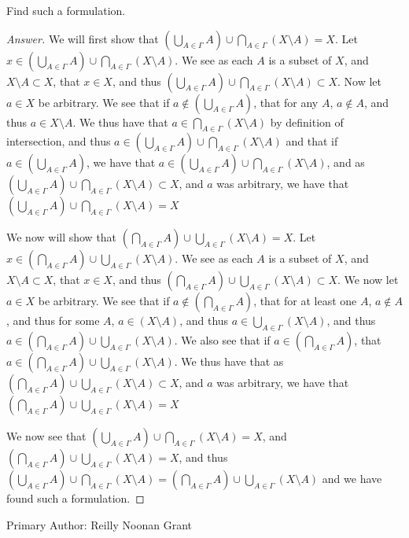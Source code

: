 \begin{minorEx}
    [Riddle]
    Find such a formulation.
\end{minorEx}
\begin{proof}[Answer]
  We will first show that $(\bigcup_{A \in \Gamma} A ) \cup
  \bigcap_{A \in\Gamma}(X \setminus A) = X$.  Let 
  $x \in (\bigcup_{A \in \Gamma} A ) \cup
  \bigcap_{A \in\Gamma}(X \setminus A)$. We see as each $A$ is a
  subset of $X$, and $X\setminus A \subset X$, that $x\in X$, and thus 
  $(\bigcup_{A \in \Gamma} A ) \cup
  \bigcap_{A \in\Gamma}(X \setminus A) \subset X$. Now let $a \in X$
  be arbitrary. We see that if $a \notin (\bigcup_{A \in \Gamma} A )$,
  that for any $A$, $a \notin A$, and thus $a \in X \setminus A$. We
  thus have that $a\in \bigcap_{A \in\Gamma}(X \setminus A)$ by
  definition of intersection, and thus $a\in (\bigcup_{A \in \Gamma} A ) \cup
  \bigcap_{A \in\Gamma}(X \setminus A)$ and that if 
  $a \in (\bigcup_{A \in \Gamma} A )$, we
  have that  $a\in (\bigcup_{A \in \Gamma} A ) \cup \bigcap_{A
    \in\Gamma}(X \setminus A)$, and as 
  $(\bigcup_{A \in \Gamma} A ) \cup \bigcap_{A\in\Gamma}
  (X \setminus A) \subset X$, and $a$ was arbitrary, we have that 
  $(\bigcup_{A \in \Gamma} A ) \cup 
  \bigcap_{A\in\Gamma}(X \setminus A) = X$

  We now will show that $(\bigcap_{A \in \Gamma} A ) \cup
  \bigcup_{A \in\Gamma}(X \setminus A) =X$.
  Let 
  $x \in (\bigcap_{A \in \Gamma} A ) \cup
  \bigcup_{A \in\Gamma}(X \setminus A)$. We see as each $A$ is a
  subset of $X$, and $X\setminus A \subset X$, that $x\in X$, and thus 
  $(\bigcap_{A \in \Gamma} A ) \cup
  \bigcup_{A \in\Gamma}(X \setminus A) \subset X$. We now let $a \in
  X$ be arbitrary. We see that if $a \notin(\bigcap_{A \in \Gamma} A
  )$, that for at least one $A$, $a\notin A$, and thus for some $A$,
  $a \in (X \setminus A)$, and thus $a \in \bigcup_{A \in\Gamma}(X
  \setminus A) $, and thus $a \in (\bigcap_{A \in \Gamma} A ) \cup
  \bigcup_{A \in\Gamma}(X \setminus A)$. We also see that if 
  $a \in(\bigcap_{A \in \Gamma} A)$, that $a \in (\bigcap_{A \in \Gamma} A ) \cup
  \bigcup_{A \in\Gamma}(X \setminus A)$. We thus have that as $(\bigcap_{A \in \Gamma} A ) \cup
  \bigcup_{A \in\Gamma}(X \setminus A) \subset X$, and $a$ was
  arbitrary, we have that 
  $(\bigcap_{A \in \Gamma} A ) \cup \bigcup_{A \in\Gamma}(X \setminus A) = X$

  We now see that $(\bigcup_{A \in \Gamma} A ) \cup
  \bigcap_{A \in\Gamma}(X \setminus A) = X$, and 
  $(\bigcap_{A \in \Gamma} A ) \cup
  \bigcup_{A \in\Gamma}(X \setminus A) =X$, and thus 
  $(\bigcup_{A \in \Gamma} A ) \cup
  \bigcap_{A \in\Gamma}(X \setminus A) =
  (\bigcap_{A \in \Gamma} A ) \cup
  \bigcup_{A \in\Gamma}(X \setminus A)$ and we have found such a formulation.

\end{proof}

Primary Author: Reilly Noonan Grant
